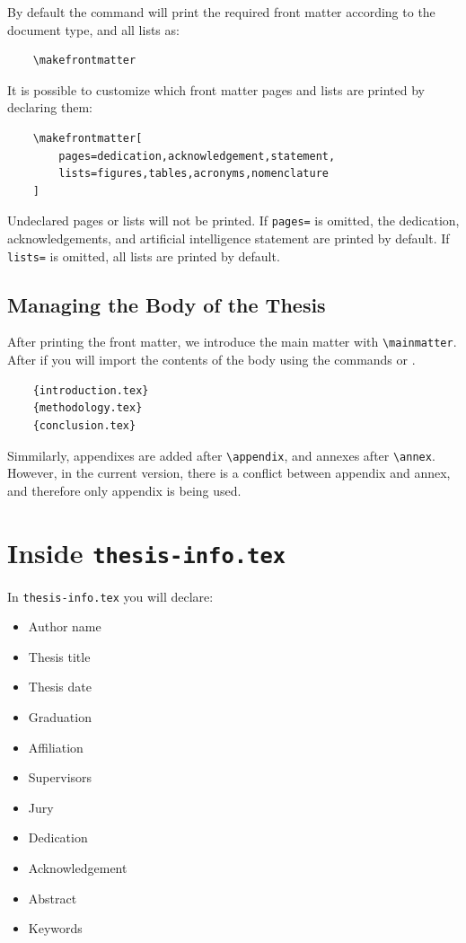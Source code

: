 By default the command will print the required front matter according to the document type, and all lists as:
\begin{verbatim}
    \makefrontmatter
\end{verbatim}
It is possible to customize which front matter pages and lists are printed by declaring them:
\begin{verbatim}
    \makefrontmatter[
        pages=dedication,acknowledgement,statement,
        lists=figures,tables,acronyms,nomenclature
    ]
\end{verbatim}
Undeclared pages or lists will not be printed. If \texttt{pages=} is omitted, the dedication, acknowledgements, and artificial intelligence statement are printed by default. If \texttt{lists=} is omitted, all lists are printed by default.

\subsection{Managing the Body of the Thesis}
After printing the front matter, we introduce the main matter with \verb|\mainmatter|. After if you will import the contents of the body using the commands \verb|| or \verb||.
\begin{verbatim}
    {introduction.tex}
    {methodology.tex}
    {conclusion.tex}
\end{verbatim}

Simmilarly, appendixes are added after \verb|\appendix|, and annexes after \verb|\annex|. However, in the current version, there is a conflict between appendix and annex, and therefore only appendix is being used.

\section{Inside \texttt{thesis-info.tex}}
In \texttt{thesis-info.tex} you will declare:
\begin{itemize}
    \item Author name
    \item Thesis title
    \item Thesis date
    \item Graduation
    \item Affiliation
    \item Supervisors
    \item Jury
    \item Dedication
    \item Acknowledgement
    \item Abstract
    \item Keywords
\end{itemize}

